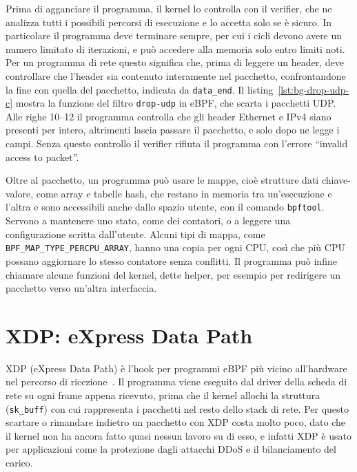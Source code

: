 Prima di agganciare il programma, il kernel lo controlla con il verifier, che ne analizza tutti i possibili percorsi di esecuzione e lo accetta solo se è sicuro. In particolare il programma deve terminare sempre, per cui i cicli devono avere un numero limitato di iterazioni, e può accedere alla memoria solo entro limiti noti. Per un programma di rete questo significa che, prima di leggere un header, deve controllare che l'header sia contenuto interamente nel pacchetto, confrontandone la fine con quella del pacchetto, indicata da \texttt{data\_end}. Il listing~\ref{lst:bg-drop-udp-c} mostra la funzione del filtro \texttt{drop-udp} in eBPF, che scarta i pacchetti UDP. Alle righe 10--12 il programma controlla che gli header Ethernet e IPv4 siano presenti per intero, altrimenti lascia passare il pacchetto, e solo dopo ne legge i campi. Senza questo controllo il verifier rifiuta il programma con l'errore ``invalid access to packet''.

\noindent\begin{minipage}{\linewidth}

\end{minipage}

Oltre al pacchetto, un programma può usare le mappe, cioè strutture dati chiave-valore, come array e tabelle hash, che restano in memoria tra un'esecuzione e l'altra e sono accessibili anche dallo spazio utente, con il comando \texttt{bpftool}. Servono a mantenere uno stato, come dei contatori, o a leggere una configurazione scritta dall'utente. Alcuni tipi di mappa, come \texttt{BPF\_MAP\_TYPE\_PERCPU\_ARRAY}, hanno una copia per ogni CPU, così che più CPU possano aggiornare lo stesso contatore senza conflitti. Il programma può infine chiamare alcune funzioni del kernel, dette helper, per esempio per redirigere un pacchetto verso un'altra interfaccia.

\section{XDP: eXpress Data Path}\label{sec:xdp}

XDP (eXpress Data Path) è l'hook per programmi eBPF più vicino all'hardware nel percorso di ricezione~\cite{cilium-bpf}. Il programma viene eseguito dal driver della scheda di rete su ogni frame appena ricevuto, prima che il kernel allochi la struttura (\texttt{sk\_buff}) con cui rappresenta i pacchetti nel resto dello stack di rete. Per questo scartare o rimandare indietro un pacchetto con XDP costa molto poco, dato che il kernel non ha ancora fatto quasi nessun lavoro su di esso, e infatti XDP è usato per applicazioni come la protezione dagli attacchi DDoS e il bilanciamento del carico.

